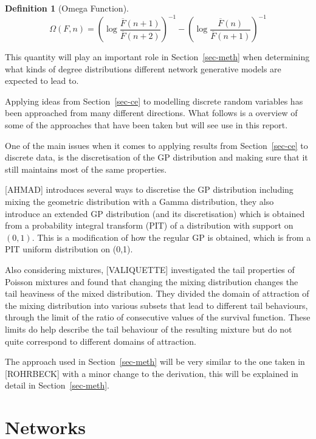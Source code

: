 \documentclass[
  10pt,
  a4paper,
]{scrreprt}
\theoremstyle{plain}
\theoremstyle{definition}
\newtheorem{definition}{Definition}[section]
\theoremstyle{remark}
\begin{document}
{\begin{definition}[Omega
Function]
\[
\Omega(F,n) = \left(\log\frac{\overline F (n+1)}{\overline F (n+2)}\right)^{-1} - \left(\log\frac{\overline F (n)}{\overline F (n+1)}\right)^{-1}
\]

\end{definition}

This quantity will play an important role in Section~\ref{sec-meth} when
determining what kinds of degree distributions different network
generative models are expected to lead to.

Applying ideas from Section~\ref{sec-ce} to modelling discrete random
variables has been approached from many different directions. What
follows is a overview of some of the approaches that have been taken but
will see use in this report.

One of the main issues when it comes to applying results from
Section~\ref{sec-ce} to discrete data, is the discretisation of the GP
distribution and making sure that it still maintains most of the same
properties.

{[}AHMAD{]} introduces several ways to discretise the GP distribution
including mixing the geometric distribution with a Gamma distribution,
they also introduce an extended GP distribution (and its discretisation)
which is obtained from a probability integral transform (PIT) of a
distribution with support on \((0,1)\). This is a modification of how
the regular GP is obtained, which is from a PIT uniform distribution on
(0,1).

Also considering mixtures, {[}VALIQUETTE{]} investigated the tail
properties of Poisson mixtures and found that changing the mixing
distribution changes the tail heaviness of the mixed distribution. They
divided the domain of attraction of the mixing distribution into various
subsets that lead to different tail behaviours, through the limit of the
ratio of consecutive values of the survival function. These limits do
help describe the tail behaviour of the resulting mixture but do not
quite correspond to different domains of attraction.

The approach used in Section~\ref{sec-meth} will be very similar to the
one taken in {[}ROHRBECK{]} with a minor change to the derivation, this
will be explained in detail in Section~\ref{sec-meth}.

\hypertarget{networks}{%
\chapter{Networks}\label{networks}}

}
\end{document}
